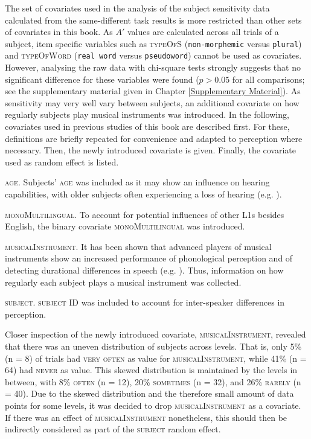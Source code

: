 The set of covariates used in the analysis of the subject sensitivity data calculated from the same-different task results is more restricted than other sets of covariates in this book. As $A'$ values are calculated across all trials of a subject, item specific variables such as \textsc{typeOfS} (\texttt{non-morphemic} versus \texttt{plural}) and \textsc{typeOfWord} (\texttt{real word} versus \texttt{pseudoword}) cannot be used as covariates. However, analysing the raw data with chi-square tests strongly suggests that no significant difference for these variables were found ($p>0.05$ for all comparisons; see the supplementary material given in Chapter \ref{Supplementary Material}). As sensitivity may very well vary between subjects, an additional covariate on how regularly subjects play musical instruments was introduced. In the following, covariates used in previous studies of this book are described first. For these, definitions are briefly repeated for convenience and adapted to perception where necessary. Then, the newly introduced covariate is given. Finally, the covariate used as random effect is listed.

\textsc{age}. Subjects’ \textsc{age} was included as it may show an influence on hearing capabilities, with older subjects often experiencing a loss of hearing (e.g. \cite{Lee2013}).

\textsc{monoMultilingual}. To account for potential influences of other L1s besides English, the binary covariate \textsc{monoMultilingual} was introduced. 

\textsc{musicalInstrument}. It has been shown that advanced players of musical instruments show an increased performance of phonological perception and of detecting durational differences in speech (e.g. \cite{Anvari2002,Milovanov2009}). Thus, information on how regularly each subject plays a musical instrument was collected.

\textsc{subject}. \textsc{subject} ID was included to account for inter-speaker differences in perception.

Closer inspection of the newly introduced covariate, \textsc{musicalInstrument}, revealed that there was an uneven distribution of subjects across levels. That is, only 5\% (n = 8) of trials had \textsc{very often} as value for \textsc{musicalInstrument}, while 41\% (n = 64) had \textsc{never} as value. This skewed distribution is maintained by the levels in between, with 8\% \textsc{often} (n = 12), 20\% \textsc{sometimes} (n = 32), and 26\% \textsc{rarely} (n = 40). Due to the skewed distribution and the therefore small amount of data points for some levels, it was decided to drop \textsc{musicalInstrument} as a covariate. If there was an effect of \textsc{musicalInstrument} nonetheless, this should then be indirectly considered as part of the \textsc{subject} random effect.

